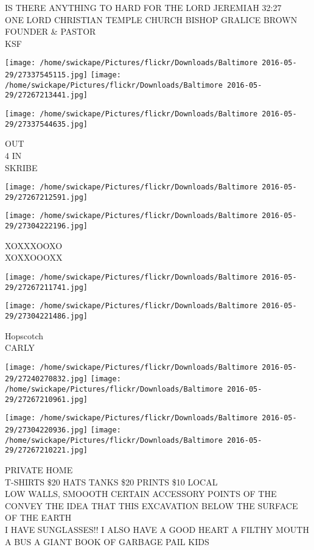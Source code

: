 \documentclass[10pt,letterpaper]{article}
\begin{document}
IS THERE ANYTHING TO HARD FOR THE LORD JEREMIAH 32:27\\
ONE LORD CHRISTIAN TEMPLE CHURCH BISHOP GRALICE BROWN FOUNDER \& PASTOR\\
KSF
\pagebreak

\texttt{[image: /home/swickape/Pictures/flickr/Downloads/Baltimore 2016-05-29/27337545115.jpg]}
\texttt{[image: /home/swickape/Pictures/flickr/Downloads/Baltimore 2016-05-29/27267213441.jpg]}

\vspace{0.25in}
\texttt{[image: /home/swickape/Pictures/flickr/Downloads/Baltimore 2016-05-29/27337544635.jpg]}

OUT\\
4 IN\\
SKRIBE
\pagebreak

\texttt{[image: /home/swickape/Pictures/flickr/Downloads/Baltimore 2016-05-29/27267212591.jpg]}

\vspace{0.25in}
\texttt{[image: /home/swickape/Pictures/flickr/Downloads/Baltimore 2016-05-29/27304222196.jpg]}

XOXXXOOXO\\
XOXXOOOXX
\pagebreak

\texttt{[image: /home/swickape/Pictures/flickr/Downloads/Baltimore 2016-05-29/27267211741.jpg]}

\vspace{0.25in}
\texttt{[image: /home/swickape/Pictures/flickr/Downloads/Baltimore 2016-05-29/27304221486.jpg]}

Hopscotch\\
CARLY
\pagebreak

\texttt{[image: /home/swickape/Pictures/flickr/Downloads/Baltimore 2016-05-29/27240270832.jpg]}
\texttt{[image: /home/swickape/Pictures/flickr/Downloads/Baltimore 2016-05-29/27267210961.jpg]}

\texttt{[image: /home/swickape/Pictures/flickr/Downloads/Baltimore 2016-05-29/27304220936.jpg]}
\texttt{[image: /home/swickape/Pictures/flickr/Downloads/Baltimore 2016-05-29/27267210221.jpg]}

PRIVATE HOME\\
T{-}SHIRTS \$20 HATS TANKS \$20 PRINTS \$10 LOCAL\\
LOW WALLS, SMOOOTH CERTAIN ACCESSORY POINTS OF THE CONVEY THE IDEA THAT THIS EXCAVATION BELOW THE SURFACE OF THE EARTH\\
I HAVE SUNGLASSES!!  I ALSO HAVE A GOOD HEART A FILTHY MOUTH A BUS A GIANT BOOK OF GARBAGE PAIL KIDS
\pagebreak
\end{document}
